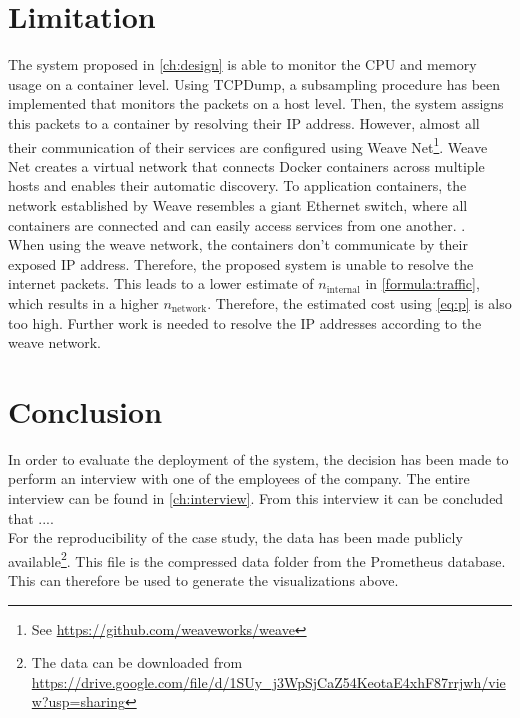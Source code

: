 \section{Limitation} \label{sec:sb-limitation}
The system proposed in \autoref{ch:design} is able to monitor the CPU and memory usage on a container level. Using TCPDump, a subsampling procedure has been implemented that monitors the packets on a host level. Then, the system assigns this packets to a container by resolving their IP address. However, almost all their communication of their services are configured using Weave Net\footnote{See \url{https://github.com/weaveworks/weave}}. Weave Net creates a virtual network that connects Docker containers across multiple hosts and enables their automatic discovery. To application containers, the network established by Weave resembles a giant Ethernet switch, where all containers are connected and can easily access services from one another. \cite{weave}.\\

\noindent
When using the weave network, the containers don't communicate by their exposed IP address. Therefore, the proposed system is unable to resolve the internet packets. This leads to a lower estimate of $n_\text{internal}$ in \autoref{formula:traffic}, which results in a higher $n_\text{network}$. Therefore, the estimated cost using \autoref{eq:p} is also too high. Further work is needed to resolve the IP addresses according to the weave network.


\section{Conclusion} \label{sec:sb-evaluation}
In order to evaluate the deployment of the system, the decision has been made to perform an interview with one of the employees of the company. The entire interview can be found in \autoref{ch:interview}. From this interview it can be concluded that ....\\

\noindent
For the reproducibility of the case study, the data has been made publicly available\footnote{The data can be downloaded from \url{https://drive.google.com/file/d/1SUy_j3WpSjCaZ54KeotaE4xhF87rrjwh/view?usp=sharing}}. This file is the compressed data folder from the Prometheus database. This can therefore be used to generate the visualizations above.